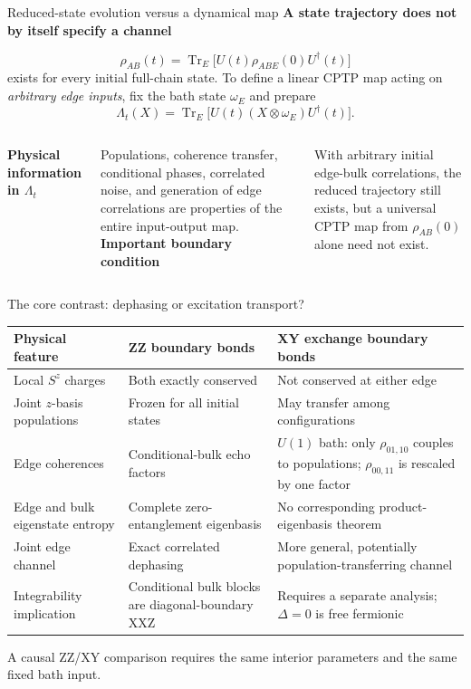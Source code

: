 \documentclass[aspectratio=169,10pt]{beamer}
\newcommand{\Tr}{\operatorname{Tr}}
\newcommand{\sechead}[1]{{\color{sea}\bfseries #1}\par\vspace{1mm}}
\newcommand{\noteinline}[1]{{\color{muted}\footnotesize #1}}
\begin{document}
\begin{frame}{Reduced-state evolution versus a dynamical map}
\sechead{A state trajectory does not by itself specify a channel}
\[
\rho_{AB}(t)=\Tr_E\!\big[U(t)\rho_{ABE}(0)U^\dagger(t)\big]
\]
exists for every initial full-chain state. To define a linear CPTP map acting on \emph{arbitrary edge inputs}, fix the bath state \(\omega_E\) and prepare
\[
\boxed{\Lambda_t(X)=\Tr_E\!\big[U(t)(X\otimes\omega_E)U^\dagger(t)\big].}
\]
\begin{columns}[T,onlytextwidth]
\sechead{Physical information in \(\Lambda_t\)}
Populations, coherence transfer, conditional phases, correlated noise, and generation of edge correlations are properties of the entire input-output map.
\sechead{Important boundary condition}
With arbitrary initial edge-bulk correlations, the reduced trajectory still exists, but a universal CPTP map from \(\rho_{AB}(0)\) alone need not exist.
\end{columns}
\end{frame}


\begin{frame}{The core contrast: dephasing or excitation transport?}
\renewcommand{\arraystretch}{1.25}
{\small
\begin{tabular}{@{}p{3.5cm}p{4.95cm}p{5.0cm}@{}}
\toprule
\textbf{Physical feature} & \textbf{ZZ boundary bonds} & \textbf{XY exchange boundary bonds}\\
\midrule
Local \(S^z\) charges & Both exactly conserved & Not conserved at either edge\\
Joint \(z\)-basis populations & Frozen for all initial states & May transfer among configurations\\
Edge coherences & Conditional-bulk echo factors & \(U(1)\) bath: only \(\rho_{01,10}\) couples to populations; \(\rho_{00,11}\) is rescaled by one factor\\
Edge and bulk eigenstate entropy & Complete zero-entanglement eigenbasis & No corresponding product-eigenbasis theorem\\
Joint edge channel & Exact correlated dephasing & More general, potentially population-transferring channel\\
Integrability implication & Conditional bulk blocks are diagonal-boundary XXZ & Requires a separate analysis; \(\Delta=0\) is free fermionic\\
\bottomrule
\end{tabular}
}
\par\vspace{.10cm}
\noteinline{A causal ZZ/XY comparison requires the same interior parameters and the same fixed bath input.}
\end{frame}
\end{document}

